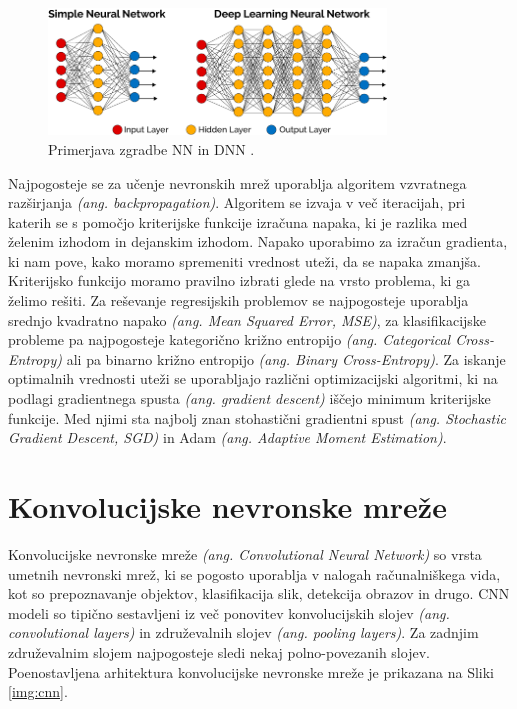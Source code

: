 \documentclass[a4paper,12pt,openright]{book}
\begin{document}
\begin{figure}[htb]
    \begin{center}
        \includegraphics[width=0.8\textwidth]{img/nn_vs_dnn.png}
    \end{center}
    \caption{Primerjava zgradbe NN in DNN \cite{nn_vs_dnn}.}
    \label{img:nn_vs_dnn}
\end{figure}

Najpogosteje se za učenje nevronskih mrež uporablja algoritem vzvratnega razširjanja \emph{(ang. backpropagation)}. Algoritem se izvaja v več iteracijah, pri katerih se s pomočjo kriterijske funkcije izračuna napaka, ki je razlika med želenim izhodom in dejanskim izhodom. Napako uporabimo za izračun gradienta, ki nam pove, kako moramo spremeniti vrednost uteži, da se napaka zmanjša. Kriterijsko funkcijo moramo pravilno izbrati glede na vrsto problema, ki ga želimo rešiti. Za reševanje regresijskih problemov se najpogosteje uporablja srednjo kvadratno napako \emph{(ang. Mean Squared Error, MSE)}, za klasifikacijske probleme pa najpogosteje kategorično križno entropijo \emph{(ang. Categorical Cross-Entropy)} ali pa binarno križno entropijo \emph{(ang. Binary Cross-Entropy)}. Za iskanje optimalnih vrednosti uteži se uporabljajo različni optimizacijski algoritmi, ki na podlagi gradientnega spusta \emph{(ang. gradient descent)} iščejo minimum kriterijske funkcije. Med njimi sta najbolj znan stohastični gradientni spust \emph{(ang. Stochastic Gradient Descent, SGD)} in Adam \emph{(ang. Adaptive Moment Estimation)}.

\section{Konvolucijske nevronske mreže}
Konvolucijske nevronske mreže \emph{(ang. Convolutional Neural Network)} so vrsta umetnih nevronski mrež, ki se pogosto uporablja v nalogah računalniškega vida, kot so prepoznavanje objektov, klasifikacija slik, detekcija obrazov in drugo. CNN modeli so tipično sestavljeni iz več ponovitev konvolucijskih slojev \emph{(ang. convolutional layers)} in združevalnih slojev \emph{(ang. pooling layers)}. Za zadnjim združevalnim slojem najpogosteje sledi nekaj polno-povezanih slojev. Poenostavljena arhitektura konvolucijske nevronske mreže je prikazana na Sliki \ref{img:cnn}.
\end{document}
